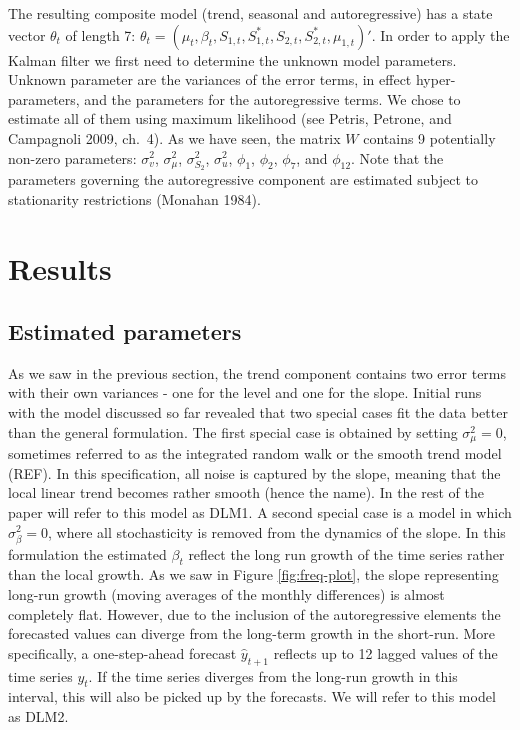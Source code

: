 \documentclass[]{article}
\begin{document}
The resulting composite model (trend, seasonal and autoregressive) has a
state vector \(\theta_t\) of length 7:
\(\theta_t = (\mu_t, \beta_t, S_{1, t}, S_{1, t}^{*}, S_{2, t}, S_{2,t}^{*}, \mu_{1,t})'\).
In order to apply the Kalman filter we first need to determine the
unknown model parameters. Unknown parameter are the variances of the
error terms, in effect hyper-parameters, and the parameters for the
autoregressive terms. We chose to estimate all of them using maximum
likelihood (see Petris, Petrone, and Campagnoli 2009, ch.~4). As we have
seen, the matrix \(W\) contains 9 potentially non-zero parameters:
\(\sigma_{v}^{2}\), \(\sigma_{\mu}^{2}\), \(\sigma_{S_{2}}^{2}\),
\(\sigma^{2}_{u}\), \(\phi_{1}\), \(\phi_{2}\), \(\phi_{7}\), and
\(\phi_{12}\). Note that the parameters governing the autoregressive
component are estimated subject to stationarity restrictions (Monahan
1984).

\section{Results}\label{results}

\subsection{Estimated parameters}\label{estimated-parameters}

As we saw in the previous section, the trend component contains two
error terms with their own variances - one for the level and one for the
slope. Initial runs with the model discussed so far revealed that two
special cases fit the data better than the general formulation. The
first special case is obtained by setting \(\sigma^{2}_{\mu} = 0\),
sometimes referred to as the integrated random walk or the smooth trend
model (REF). In this specification, all noise is captured by the slope,
meaning that the local linear trend becomes rather smooth (hence the
name). In the rest of the paper will refer to this model as DLM1. A
second special case is a model in which \(\sigma^{2}_{\beta} = 0\),
where all stochasticity is removed from the dynamics of the slope. In
this formulation the estimated \(\beta_{t}\) reflect the long run growth
of the time series rather than the local growth. As we saw in Figure
\ref{fig:freq-plot}, the slope representing long-run growth (moving
averages of the monthly differences) is almost completely flat. However,
due to the inclusion of the autoregressive elements the forecasted
values can diverge from the long-term growth in the short-run. More
specifically, a one-step-ahead forecast \(\hat{y}_{t + 1}\) reflects up
to 12 lagged values of the time series \(y_{t}\). If the time series
diverges from the long-run growth in this interval, this will also be
picked up by the forecasts. We will refer to this model as DLM2.
\end{document}
